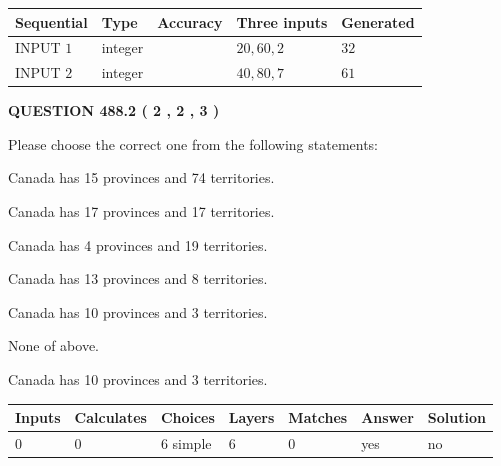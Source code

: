 \documentclass[12pt]{article}
\begin{document}
  
\noindent\begin{tabular}{|l|l|l|l|l|}
\hline
 Sequential & Type & Accuracy & Three inputs & Generated \\ 
\hline
 
 
  INPUT $  1 $ & integer &  & $
 20
 , 
 60
 , 
 2
 $ & $ 32 $ 
 \\  \hline  
 
 
  INPUT $  2 $ & integer &  & $
 40
 , 
 80
 , 
 7
 $ & $ 61 $ 
 \\  \hline  
 \end{tabular}
   
   
  
\vspace{0.2in}
  
{\textbf{\Large{QUESTION
488.2 
 ( 2 , 2 , 3 )
}}}
  
  
Please choose the correct one from the following statements:
 
 
Canada has  15 provinces and  74 territories.
 
 
Canada has  17 provinces and  17 territories.
 
 
Canada has   4 provinces and  19 territories.
 
 
Canada has  13 provinces and  8 territories.
 
 
Canada has 10  provinces and 3 territories.
 
 
 None of above.
 
 
\noindent{}
 
 
Canada has 10  provinces and 3 territories.
 
 
\noindent{}
 
 
   
   
   
   
\noindent\begin{tabular}{|l|l|l|l|l|l|l|}
 \hline
Inputs & Calculates & Choices & Layers & Matches & Answer & Solution \\ \hline
 0  & 
 0  & 
 6
  simple  
  & 
 6  & 
 0  & 
  yes & 
  no 
  \\ \hline
 \end{tabular}
   
\end{document}
